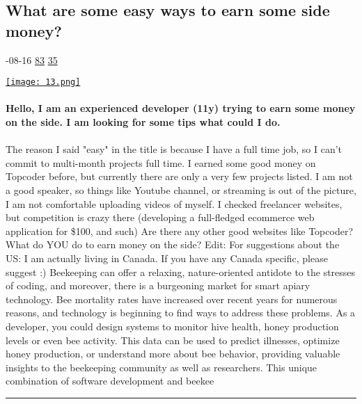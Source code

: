 \documentclass[10pt,a4paper]{article}
\begin{document}
\begin{multicols*}{2}
\begin{minipage}{\linewidth}
\subsection{What are some easy ways to earn some side money?}
\textsc{\footnotesize
{\scriptsize\faCalendar}-08-16 
{\scriptsize\faThumbsOUp}\space 
\href{http://news.ycombinator.com/item?id=37138807\&utm\_term=comment}{83} 
{\scriptsize\faComments}\space 
\href{http://news.ycombinator.com/item?id=37138807\&utm\_term=comment}{35} 
}
\par\medskip\noindent
\href{https://news.ycombinator.com/item?id=37150862\&utm\_source=hackernewsletter\&utm\_medium=email\&utm\_term=ask\_hn}{
    \texttt{[image: 13.png]}
}
\end{minipage}
\paragraph{}
\textbf{Hello,
I am an experienced developer (11y) trying to earn some money on the side.
I am looking for some tips what could I do.}
\paragraph{}

The reason I said "easy" in the title is because I have a full time job, so I can't commit to multi-month projects full time.
I earned some good money on Topcoder before, but currently there are only a very few projects listed.
I am not a good speaker, so things like Youtube channel, or streaming is out of the picture, I am not comfortable uploading videos of myself.
I checked freelancer websites, but competition is crazy there (developing a full-fledged ecommerce web application for \$100, and such)
Are there any other good websites like Topcoder?
What do YOU do to earn money on the side?
Edit: For suggestions about the US: I am actually living in Canada. If you have any Canada specific, please suggest :)
Beekeeping can offer a relaxing, nature-oriented antidote to the stresses of coding, and moreover, there is a burgeoning market for smart apiary technology. Bee mortality rates have increased over recent years for numerous reasons, and technology is beginning to find ways to address these problems.
As a developer, you could design systems to monitor hive health, honey production levels or even bee activity. This data can be used to predict illnesses, optimize honey production, or understand more about bee behavior, providing valuable insights to the beekeeping community as well as researchers.
This unique combination of software development and beekee
\par\noindent\textcolor{red}{\rule{\linewidth}{0.2mm}}
\vfill
\null
\end{multicols*}
\end{document}
